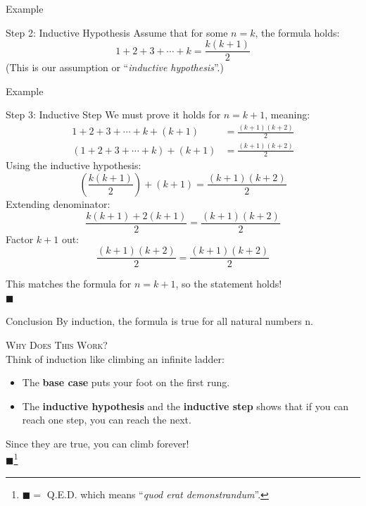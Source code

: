 \documentclass[aspectratio=169]{beamer}
\renewcommand{\qed}{\\ \hfill $\blacksquare$}
\begin{document}
\begin{frame}{Example}
    \begin{exampleblock}{Step 2: Inductive Hypothesis}
        Assume that for some $n = k$, the formula holds:
        $$
            1 + 2 + 3 + \cdots + k = \frac{k(k + 1)}{2}
        $$
        (This is our assumption or ``\textit{inductive hypothesis}''.)
    \end{exampleblock}
\end{frame}

\begin{frame}{Example}
    \scriptsize
    \begin{exampleblock}{Step 3: Inductive Step}
        We must prove it holds for $n = k + 1$, meaning:
        \begin{equation*}
            \begin{split}
                1 + 2 + 3 + \cdots + k + (k + 1)   &= \frac{(k + 1)(k + 2)}{2} \\
                (1 + 2 + 3 + \cdots + k) + (k + 1) &= \frac{(k + 1)(k + 2)}{2}
            \end{split}
        \end{equation*}
        \pause
        Using the inductive hypothesis:
        $$
            \left( \frac{k (k + 1)}{2} \right) + (k + 1) = \frac{(k + 1)(k + 2)}{2}
        $$ \pause
        Extending denominator:
        $$
            \frac{k (k + 1) + 2(k + 1)}{2} = \frac{(k + 1)(k + 2)}{2}
        $$ \pause
        Factor $k + 1$ out:
        $$
            \frac{(k + 1)(k + 2)}{2} = \frac{(k + 1)(k + 2)}{2}
        $$
    \end{exampleblock}
    This matches the formula for $n = k + 1$, so the statement holds!
    \qed
\end{frame}

\begin{frame}{Conclusion}
    By induction, the formula is true for all natural numbers n.\\
    \vspace{5mm}

    \textsc{Why Does This Work?}\\
    \vspace{2mm}
    Think of induction like climbing an infinite ladder:

    \begin{itemize}
        \item The \textbf{base case} puts your foot on the first rung.
        \item The \textbf{inductive hypothesis} and the \textbf{inductive step} shows that if you can reach one step, you can reach the next.
    \end{itemize}

    Since they are true, you can climb forever!
    \qed \footnote{$\blacksquare =$ Q.E.D. which means ``\textit{quod erat demonstrandum}''.}
\end{frame}
\end{document}
